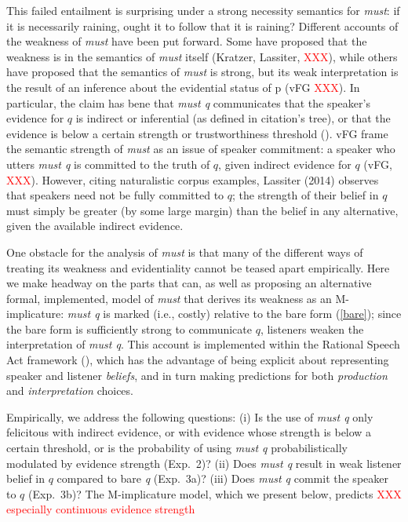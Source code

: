 \documentclass[11pt]{article}
\newcommand{\red}[1]{\textcolor{Red}{#1}}
\begin{document}
This failed entailment is surprising under a strong necessity semantics for \emph{must}: if it is necessarily raining, ought it to follow that it is raining? Different accounts of the weakness of \emph{must} have been put forward. Some have proposed that the weakness is in the semantics of \emph{must} itself (Kratzer, Lassiter, \red{XXX}), while others have proposed that the semantics of \emph{must} is strong, but its weak interpretation is the result of an inference about the evidential status of p (vFG \red{XXX}). In particular, the claim has bene that \emph{must q} communicates that the speaker's evidence for $q$ is indirect or inferential (as defined in \cite{confintelgillies2010,lassiter2014salt} citation's tree), or that the evidence is below a certain strength or trustworthiness threshold (\cite{matthewson2015}). vFG frame the semantic strength of \emph{must} as an issue of speaker commitment: a speaker who utters \emph{must q} is committed to the truth of $q$, given indirect evidence for $q$ (vFG, \red{XXX}). However, citing naturalistic corpus examples, Lassiter (2014) observes that speakers need not be fully committed to $q$; the strength of their belief in $q$ must simply be greater (by some large margin) than the belief in any alternative, given the available indirect evidence.

One obstacle for the analysis of \emph{must} is that many of the different ways of treating its weakness and evidentiality cannot be teased apart empirically. Here we make headway on the parts that can, as well as proposing an alternative formal, implemented, model of \emph{must} that derives its weakness as an M-implicature: \emph{must q} is marked (i.e., costly) relative to the bare form (\ref{bare}); since the bare form is sufficiently strong to communicate $q$, listeners weaken the interpretation of \emph{must q}. This account is implemented within the Rational Speech Act framework (\cite{frank2012, goodmanstuhlmueller2013}), which has the advantage of being explicit about representing speaker and listener \emph{beliefs}, and in turn making predictions for both \emph{production} and  \emph{interpretation} choices.

Empirically, we address the following questions: (i) Is the use of \emph{must q} only felicitous with indirect evidence, or with evidence whose strength is below a certain threshold, or is the probability of using \emph{must q} probabilistically modulated by evidence strength (Exp.~2)? (ii) Does \emph{must q} result in weak listener belief in $q$ compared to bare \emph{q} (Exp.~3a)? (iii) Does \emph{must q} commit the speaker to $q$ (Exp.~3b)? The M-implicature model, which we present below, predicts \red{XXX especially continuous evidence strength}
\end{document}
